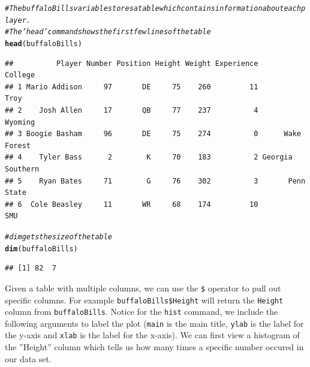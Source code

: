 \documentclass{article}\usepackage[]{graphicx}\usepackage[]{color}
\makeatletter
\newcommand{\hlcom}[1]{\textcolor[rgb]{0.678,0.584,0.686}{\textit{#1}}}%
\newcommand{\hlstd}[1]{\textcolor[rgb]{0.345,0.345,0.345}{#1}}%
\newcommand{\hlkwd}[1]{\textcolor[rgb]{0.737,0.353,0.396}{\textbf{#1}}}%
\newenvironment{kframe}{%
 \def\at@end@of@kframe{}%
 \ifinner\ifhmode%
  \def\at@end@of@kframe{\end{minipage}}%
  \begin{minipage}{\columnwidth}%
 \fi\fi%
 \def\FrameCommand##1{\hskip\@totalleftmargin \hskip-\fboxsep
 \colorbox{shadecolor}{##1}\hskip-\fboxsep
     \hskip-\linewidth \hskip-\@totalleftmargin \hskip\columnwidth}%
 \MakeFramed {\advance\hsize-\width
   \@totalleftmargin\z@ \linewidth\hsize
   \@setminipage}}%
 {\par\unskip\endMakeFramed%
 \at@end@of@kframe}
\newenvironment{knitrout}{}{} %
\makeatother
\begin{document}
\begin{knitrout}
\color{fgcolor}\begin{kframe}
\begin{alltt}
\hlcom{# The buffaloBills variable stores a table which contains information about each player.}
\hlcom{#The 'head' command shows the first few lines of the table}
\hlkwd{head}\hlstd{(buffaloBills)}
\end{alltt}
\begin{verbatim}
##          Player Number Position Height Weight Experience          College
## 1 Mario Addison     97       DE     75    260         11             Troy
## 2    Josh Allen     17       QB     77    237          4          Wyoming
## 3 Boogie Basham     96       DE     75    274          0      Wake Forest
## 4    Tyler Bass      2        K     70    183          2 Georgia Southern
## 5    Ryan Bates     71        G     76    302          3       Penn State
## 6  Cole Beasley     11       WR     68    174         10              SMU
\end{verbatim}
\begin{alltt}
\hlcom{# dim gets the size of the table}
\hlkwd{dim}\hlstd{(buffaloBills)}
\end{alltt}
\begin{verbatim}
## [1] 82  7
\end{verbatim}
\end{kframe}
\end{knitrout}

Given a table with multiple columns, we can use the \texttt{\$} operator to pull out specific columns. For example \texttt{buffaloBills\$Height} will return the \texttt{Height} column from \texttt{buffaloBills}. Notice for the \texttt{hist} command, we include the following arguments to label the plot (\texttt{main} is the main title, \texttt{ylab} is the label for the y-axis and \texttt{xlab} is the label for the x-axis). We can first view a histogram of the ''Height'' column which tells us how many times a specific number occured in our data set.
\end{document}
